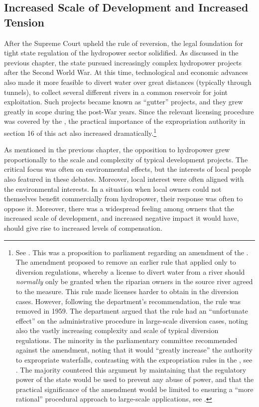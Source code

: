 \subsection{Increased Scale of Development and Increased Tension}

After the Supreme Court upheld the rule of reversion, the legal foundation for tight state regulation of the hydropower sector solidified. As discussed in the previous chapter, the state pursued increasingly complex hydropower projects after the Second World War. At this time, technological and economic advances also made it more feasible to divert water over great distances (typically through tunnels), to collect several different rivers in a common reservoir for joint exploitation. Such projects became known as ``gutter'' projects, and they grew greatly in scope during the post-War years. Since the relevant licensing procedure was covered by the \cite{wra17}, the practical importance of the expropriation authority in section 16 of this act also increased dramatically.\footnote{See \cite[11]{innst59}. This was a proposition to parliament regarding an amendment of the \cite{wra17}. The amendment proposed to remove an earlier rule that applied only to diversion regulations, whereby a license to divert water from a river should {\it normally} only be granted when the riparian owners in the source river agreed to the measure. This rule made licenses harder to obtain in the diversion cases. However, following the department's recommendation, the rule was removed in 1959. The department argued that the rule had an ``unfortunate effect'' on the administrative procedure in large-scale diversion cases, noting also the vastly increasing complexity and scale of typical diversion regulations. The minority in the parliamentary committee recommended against the amendment, noting that it would ``greatly increase'' the authority to expropriate waterfalls, contrasting with the expropriation rules in the \cite{wra40}, see \cite[14]{innst59}. The majority countered this argument by maintaining that the regulatory power of the state would be used to prevent any abuse of power, and that the practical significance of the amendment would be limited to ensuring a ``more rational'' procedural approach to large-scale applications, see \cite[14]{innst59}.}

As mentioned in the previous chapter, the opposition to hydropower grew proportionally to the scale and complexity of typical development projects. The critical focus was often on environmental effects, but the interests of local people also featured in these debates. Moreover, local interest were often aligned with the environmental interests. In a situation when local owners could not themselves benefit commercially from hydropower, their response was often to oppose it. Moreover, there was a widespread feeling among owners that the increased scale of development, and increased negative impact it would have, should give rise to increased levels of compensation.

